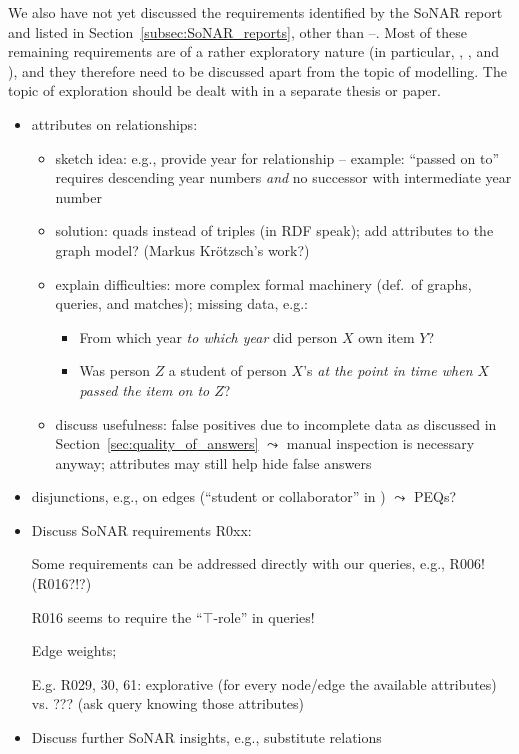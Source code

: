 We also have not yet discussed the requirements identified by the SoNAR report
and listed in Section~\ref{subsec:SoNAR_reports},
other than --.
Most of these remaining requirements are of a rather exploratory nature
(in particular, , , and ),
and they therefore need to be discussed apart from the topic of modelling.
The topic of exploration should be dealt with in a separate
thesis or paper.


%
\begin{itemize}
  \item
    attributes on relationships:
    \begin{itemize}
      \item
        sketch idea: e.g., provide year for relationship  -- example: \enquote{passed on to} requires descending year numbers \emph{and} no successor with intermediate year number
      \item
        solution: quads instead of triples (in \gls{RDF} speak); add attributes to the graph model? (Markus Krötzsch's work?)
      \item
        explain difficulties: more complex formal machinery (def.\ of graphs, queries, and matches); missing data, e.g.:
        \begin{itemize}
          \item
            From which year \emph{to which year} did person $X$ own item $Y$?
          \item
            Was person $Z$ a student of person $X$'s \emph{at the point in time when $X$ passed the item on to $Z$}?
        \end{itemize}
      \item
        discuss usefulness: false positives due to incomplete data as discussed in Section~\ref{sec:quality_of_answers}
        $\leadsto$ manual inspection is necessary anyway; attributes may still help hide false answers
    \end{itemize}
  \item
    disjunctions, e.g., on edges (\enquote{student or collaborator} in ) $\leadsto$ PEQs?
  \item
    Discuss \gls{SoNAR} requirements R0xx:
    
    Some requirements can be addressed directly with our queries, e.g., R006! (R016?!?)

    R016 seems to require the \enquote{$\top$-role} in queries!

    Edge weights;

    E.g. R029, 30, 61: explorative (for every node/edge the available attributes) vs. ??? (ask query knowing those attributes)
    
  \item
    Discuss further SoNAR insights, e.g., substitute relations
    
\end{itemize}
